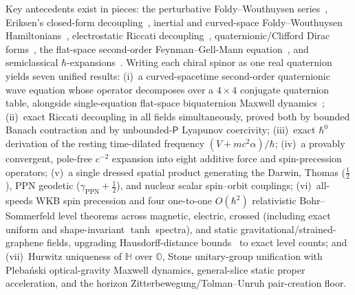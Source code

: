 \documentclass[aps,prd,onecolumn,tightenlines,nofootinbib,notitlepage,10pt,floatfix]{revtex4-2}
\theoremstyle{indentedtheorem}
\begin{document}
Key antecedents exist in pieces: the perturbative Foldy--Wouthuysen series~\citep{Foldy1950Dirac}, Eriksen's closed-form decoupling~\citep{Eriksen1958Foldy}, inertial and curved-space Foldy--Wouthuysen Hamiltonians~\citep{HehlNi1990Inertial,Silenko2008Foldy,ObukhovSilenkoTeryaev2009Spin,ObukhovSilenkoTeryaev2011Dirac,ObukhovSilenkoTeryaev2013Spin}, electrostatic Riccati decoupling~\citep{Heully1986Diagonalisation,KutzelniggLiu2005Quasirelativistic}, quaternionic/Clifford Dirac forms~\citep{Lanczos1929Tensoranalytischen,Hestenes1967Real,DeLeoRotelli1994Translations,DeLeoRodrigues1998Quaternionic,LasenbyDoranGull1998Gravity}, the flat-space second-order Feynman--Gell-Mann equation~\citep{FeynmanGellMann1958Theory}, and semiclassical $\hbar$-expansions~\citep{RubinowKeller1963Asymptotic,BolteKeppeler1999Semiclassical,PanatiSpohnTeufel2003Space,Keppeler2003Semiclassical,BeckerFujiieWittsten2025Bohr}. Writing each chiral spinor as one real quaternion yields seven unified results: (i)~a curved-spacetime second-order quaternionic wave equation whose operator decomposes over a $4\times 4$ conjugate quaternion table, alongside single-equation flat-space biquaternion Maxwell dynamics~\citep{Silberstein1912Quaternionic,BialynickiBirula1996Photon}; (ii)~exact Riccati decoupling in all fields simultaneously, proved both by bounded Banach contraction and by unbounded-$\mathsf{P}$ Lyapunov coercivity; (iii)~exact $\hbar^0$ derivation of the resting time-dilated frequency $(V+mc^2\alpha)/\hbar$; (iv)~a provably convergent, pole-free $c^{-2}$ expansion into eight additive force and spin-precession operators; (v)~a single dressed spatial product generating the Darwin, Thomas ($\tfrac{1}{2}$), PPN geodetic ($\gamma_\text{PPN}+\tfrac{1}{2}$), and nuclear scalar spin--orbit couplings; (vi)~all-speeds WKB spin precession and four one-to-one $O(\hbar^2)$ relativistic Bohr--Sommerfeld level theorems across magnetic, electric, crossed (including exact uniform and shape-invariant $\tanh$ spectra), and static gravitational/strained-graphene fields, upgrading Hausdorff-distance bounds~\citep{BeckerFujiieWittsten2025Bohr} to exact level counts; and (vii)~Hurwitz uniqueness of $\mathbb{H}$ over $\mathbb{O}$, Stone unitary-group unification with Pleba\'nski optical-gravity Maxwell dynamics, general-slice static proper acceleration, and the horizon Zitterbewegung/Tolman--Unruh pair-creation floor.
\end{document}
